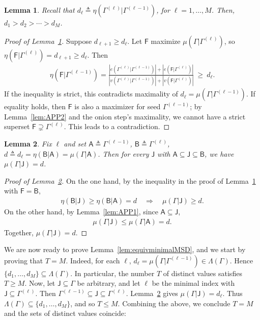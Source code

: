 \documentclass[12pt]{article}
\newtheorem{lemma}{Lemma}
\newcommand{\s}[1]{\mathsf{#1}}
\begin{document}
\begin{lemma}\label{lem:APP3}
Recall that $d_\ell \triangleq \eta \left(\Gamma^{(\ell)}\vert\Gamma^{(\ell-1)}\right)$, for $\ell=1,\ldots,M$. Then, $d_1>d_2>\cdots>d_M$. 
\end{lemma}
\begin{proof}[Proof of Lemma~\ref{lem:APP3}]
    Suppose $d_{\ell+1}\ge d_\ell$. Let $\s{F}$ maximize $\mu(\Gamma\vert\Gamma^{(\ell)})$, so $\eta(\s{F}\vert\Gamma^{(\ell)})=d_{\ell+1}\ge d_\ell$. Then
\begin{align}
\eta(\s{F}\vert\Gamma^{(\ell-1)})=\frac{|e(\Gamma^{(\ell)}\vert\Gamma^{(\ell-1)})|+|e(\s{F}\vert\Gamma^{(\ell)})|}{|v(\Gamma^{(\ell)}\vert\Gamma^{(\ell-1)})|+|v(\s{F}\vert\Gamma^{(\ell)})|}\ \ge\ d_\ell.
\end{align}
If the inequality is strict, this contradicts maximality of $d_\ell=\mu(\Gamma\vert\Gamma^{(\ell-1)})$. If equality holds, then $\s{F}$ is also a maximizer for seed $\Gamma^{(\ell-1)}$; by Lemma~\ref{lem:APP2} and the onion step's maximality, we cannot have a strict superset $\s{F}\supsetneq\Gamma^{(\ell)}$. This leads to a contradiction. 
\end{proof}
\begin{lemma}\label{lem:APP4}
    Fix $\ell$ and set $\s{A}\triangleq\Gamma^{(\ell-1)}$, $\s{B}\triangleq\Gamma^{(\ell)}$, $d\triangleq d_\ell=\eta(\s{B}\vert \s{A})=\mu(\Gamma\vert\s{A})$.  
Then for every $\s{J}$ with $\s{A}\subseteq \s{J}\subseteq \s{B}$, we have $\mu(\Gamma\vert\s{J})=d$.
\end{lemma}
\begin{proof}[Proof of Lemma~\ref{lem:APP4}]
On the one hand, by the inequality in the proof of Lemma~\ref{lem:APP3} with $\s{F}=\s{B}$,
\begin{align}
\eta(\s{B}\vert \s{J})\ge\eta(\s{B}\vert\s{A})=d\quad\Rightarrow\quad \mu(\Gamma\vert\s{J})\ge d.
\end{align}
On the other hand, by Lemma~\ref{lem:APP1}, since $\s{A}\subseteq \s{J}$,
\begin{align}
\mu(\Gamma\vert\s{J})\le\mu(\Gamma\vert\s{A})=d.
\end{align}
Together, $\mu(\Gamma\vert\s{J})=d$.
\end{proof}
We are now ready to prove Lemma~\ref{lem:equivminimalMSD}, and we start by proving that $T=M$. Indeed, for each $\ell$, $d_\ell=\mu(\Gamma\vert\Gamma^{(\ell-1)})\in \Lambda(\Gamma)$. Hence $\{d_1,\dots,d_M\}\subseteq \Lambda(\Gamma)$. In particular, the number $T$ of distinct values satisfies $T\ge M$. Now, let $\s{J}\subseteq\Gamma$ be arbitrary, and let $\ell$ be the minimal index with $\s{J}\subseteq \Gamma^{(\ell)}$. Then $\Gamma^{(\ell-1)}\subseteq \s{J}\subseteq \Gamma^{(\ell)}$. Lemma~\ref{lem:APP4} gives $\mu(\Gamma\vert\s{J})=d_\ell$. Thus $\Lambda(\Gamma)\subseteq\{d_1,\dots,d_M\}$, and so $T\le M$. Combining the above, we conclude $T=M$ and the sets of distinct values coincide:
\end{document}
